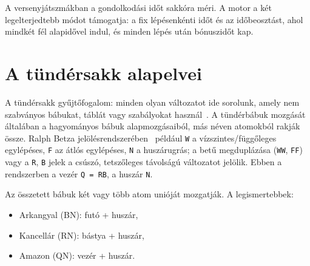 A versenyjátszmákban a gondolkodási időt sakkóra méri. A motor a két legelterjedtebb módot támogatja: a fix lépésenkénti időt és az időbeosztást, ahol mindkét fél alapidővel indul, és minden lépés után bónuszidőt kap.

\section{A tündérsakk alapelvei}

A tündérsakk gyűjtőfogalom: minden olyan változatot ide sorolunk, amely nem szabványos bábukat, táblát vagy szabályokat használ~\cite{Pritchard07}. A tündérbábuk mozgását általában a hagyományos bábuk alapmozgásaiból, más néven atomokból rakják össze. Ralph Betza jelölésrendszerében~\cite{Betza} például \texttt{W} a vízszintes/függőleges egylépéses, \texttt{F} az átlós egylépéses, \texttt{N} a huszárugrás; a betű megduplázása (\texttt{WW}, \texttt{FF}) vagy a \texttt{R}, \texttt{B} jelek a csúszó, tetszőleges távolságú változatot jelölik. Ebben a rendszerben a vezér \texttt{Q = RB}, a huszár \texttt{N}.

Az összetett bábuk két vagy több atom unióját mozgatják. A legismertebbek:
\begin{itemize}
	\item {Arkangyal} (BN): futó + huszár,
	\item {Kancellár} (RN): bástya + huszár,
	\item {Amazon} (QN): vezér + huszár.
\end{itemize}

\newcommand{\fairyboard}[3]{%
	\begin{tikzpicture}[scale=0.45]
		\foreach \x in {0,...,7} \foreach \y in {0,...,7} {
			\pgfmathparse{mod(\x+\y,2)==0 ? "brown!45" : "brown!12"}
			\fill[\pgfmathresult] (\x,\y) rectangle ++(1,1);
		}
		\foreach \dx/\dy in {#1} {
			\foreach \k in {1,...,7} {
				\pgfmathsetmacro{\px}{3+\k*\dx}\pgfmathsetmacro{\py}{3+\k*\dy}
				\ifdim \px pt>-1pt \ifdim \px pt<8pt \ifdim \py pt>-1pt \ifdim \py pt<8pt
					\fill[blue!60] (\px+0.5,\py+0.5) circle (0.17);
				\fi\fi\fi\fi
			}
		}
		\foreach \dx/\dy in {1/2,2/1,-1/2,-2/1,1/-2,2/-1,-1/-2,-2/-1} {
			\fill[red!75!black] (3+\dx+0.5,3+\dy+0.5) circle (0.22);
		}
		\node[font=\bfseries] at (3.5,3.5) {#2};
		\draw[thick] (0,0) rectangle (8,8);
		\foreach \f [count=\i from 0] in {a,...,h} \node[font=\scriptsize] at (\i+0.5,-0.4) {\f};
		\foreach \r in {1,...,8} \node[font=\scriptsize] at (-0.4,\r-0.5) {\r};
		\node[font=\small] at (4,-1.3) {#3};
	\end{tikzpicture}%
}

